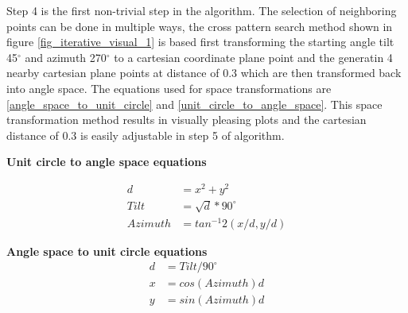 \noindent Step 4 is the first non-trivial step in the algorithm. The selection of neighboring points can be done in multiple ways, the cross pattern search method shown in figure \ref{fig_iterative_visual_1} is based first transforming the starting angle tilt 45$^\circ$  and azimuth 270$^\circ$ to a cartesian coordinate plane point and the generatin 4 nearby cartesian plane points at distance of 0.3 which are then transformed back into angle space. The equations used for space transformations are \ref{angle_space_to_unit_circle} and \ref{unit_circle_to_angle_space}. This space transformation method results in visually pleasing plots and the cartesian distance of 0.3 is easily adjustable in step 5 of algorithm.

\newpage

\noindent \textbf{Unit circle to angle space equations}

\begin{equation}
\begin{split}
\label{unit_circle_to_angle_space}
d &= x^2+y^2\\
Tilt &= \sqrt{d}*90^\circ\\
Azimuth &= tan^{-1}2(x/d, y/d)
\end{split}
\end{equation}

\noindent \textbf{Angle space to unit circle equations}
\begin{equation}
\begin{split}
\label{angle_space_to_unit_circle}
d &= Tilt/90^\circ \\
x &= cos(Azimuth)d \\
y &= sin(Azimuth)d \\
\end{split}
\end{equation}

\vspace{5mm}





